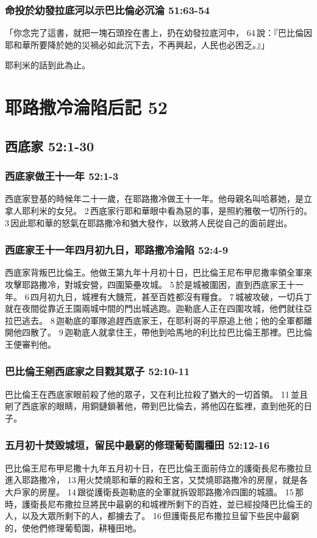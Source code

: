 \subsubsection{命投於幼發拉底河以示巴比倫必沉淪 51:63-54}
「你念完了這書，就把一塊石頭拴在書上，扔在幼發拉底河中， 64 說：『巴比倫因耶和華所要降於她的災禍必如此沉下去，不再興起，人民也必困乏。』」

耶利米的話到此為止。

\section{耶路撒冷淪陷后記 52}
\subsection{西底家 52:1-30}
\subsubsection{西底家做王十一年 52:1-3}
西底家登基的時候年二十一歲，在耶路撒冷做王十一年。他母親名叫哈慕她，是立拿人耶利米的女兒。 2 西底家行耶和華眼中看為惡的事，是照約雅敬一切所行的。 3 因此耶和華的怒氣在耶路撒冷和猶大發作，以致將人民從自己的面前趕出。

\subsubsection{西底家王十一年四月初九日，耶路撒冷淪陷 52:4-9}
西底家背叛巴比倫王。他做王第九年十月初十日，巴比倫王尼布甲尼撒率領全軍來攻擊耶路撒冷，對城安營，四圍築壘攻城。 5 於是城被圍困，直到西底家王十一年。 6 四月初九日，城裡有大饑荒，甚至百姓都沒有糧食。 7 城被攻破，一切兵丁就在夜間從靠近王園兩城中間的門出城逃跑。迦勒底人正在四圍攻城，他們就往亞拉巴逃去。 8 迦勒底的軍隊追趕西底家王，在耶利哥的平原追上他；他的全軍都離開他四散了。 9 迦勒底人就拿住王，帶他到哈馬地的利比拉巴比倫王那裡。巴比倫王便審判他。

\subsubsection{巴比倫王剜西底家之目戮其眾子 52:10-11}
巴比倫王在西底家眼前殺了他的眾子，又在利比拉殺了猶大的一切首領。 11 並且剜了西底家的眼睛，用銅鏈鎖著他，帶到巴比倫去，將他囚在監裡，直到他死的日子。

\subsubsection{五月初十焚毀城垣，留民中最窮的修理葡萄園種田 52:12-16}
巴比倫王尼布甲尼撒十九年五月初十日，在巴比倫王面前侍立的護衛長尼布撒拉旦進入耶路撒冷， 13 用火焚燒耶和華的殿和王宮，又焚燒耶路撒冷的房屋，就是各大戶家的房屋。 14 跟從護衛長迦勒底的全軍就拆毀耶路撒冷四圍的城牆。 15 那時，護衛長尼布撒拉旦將民中最窮的和城裡所剩下的百姓，並已經投降巴比倫王的人，以及大眾所剩下的人，都擄去了。 16 但護衛長尼布撒拉旦留下些民中最窮的，使他們修理葡萄園，耕種田地。

